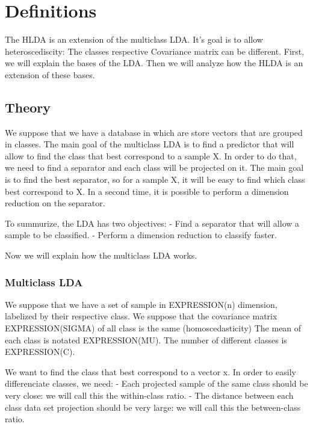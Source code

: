 
\section{Definitions}
\label{sec:definitions}

The HLDA is an extension of the multiclass LDA.
It's goal is to allow heteroscediscity: The classes respective Covariance matrix
can be different.
First, we will explain the bases of the LDA.
Then we will analyze how the HLDA is an extension of these bases.

\subsection{Theory}

We suppose that we have a database in which are store vectors that are grouped in classes.
The main goal of the multiclass LDA is to find a predictor that will allow to find the class that best
correspond to a sample X.
In order to do that, we need to find a separator and each class will be projected on it.
The main goal is to find the best separator, so for a sample X, it will be easy to find which class
best correspond to X.
In a second time, it is possible to perform a dimension reduction on the separator.

To summurize, the LDA has two objectives:
- Find a separator that will allow a sample to be classified.
- Perform a dimension reduction to classify faster.

Now we will explain how the multiclass LDA works. 

\subsubsection{Multiclass LDA}

We suppose that we have a set of sample in EXPRESSION(n) dimension, labelized by their respective
class.
We suppose that the covariance matrix EXPRESSION(SIGMA) of all class is the same (homoscedasticity)
The mean of each class is notated EXPRESSION(MU).
The number of different classes is EXPRESSION(C).

We want to find the class that best correspond to a vector x.
In order to easily differenciate classes, we need:
- Each projected sample of the same class should be very close: we will call this the within-class ratio.
- The distance between each class data set projection should be very large: we will call this the between-class ratio.

